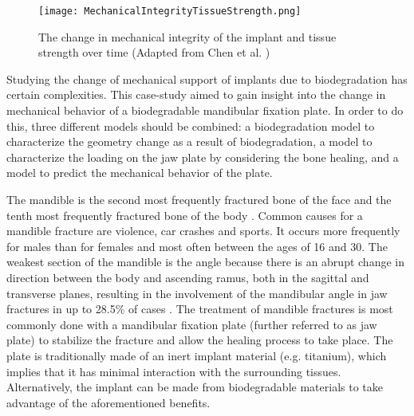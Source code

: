 \begin{figure}[ht]
    \centering
    \texttt{[image: MechanicalIntegrityTissueStrength.png]}
    \caption{The change in mechanical integrity of the implant and tissue strength over time (Adapted from Chen et al. \cite{KChen})}
    \label{fig:rateofdeg}
\end{figure}

Studying the change of mechanical support of implants due to biodegradation has certain complexities. This case-study aimed to gain insight into the change in mechanical behavior of a biodegradable mandibular fixation plate. In order to do this, three different models should be combined: a biodegradation model to characterize the geometry change as a result of biodegradation, a model to characterize the loading on the jaw plate by considering the bone healing, and a model to predict the mechanical behavior of the plate.

The mandible is the second most frequently fractured bone of the face and the tenth most frequently fractured bone of the body \cite{Bhavik}. Common causes for a mandible fracture are violence, car crashes and sports. It occurs more frequently for males than for females and most often between the ages of 16 and 30. The weakest section of the mandible is the angle because there is an abrupt change in direction between the body and ascending ramus, both in the sagittal and transverse planes, resulting in the involvement of the mandibular angle in jaw fractures in up to 28.5\% of cases \cite{Levy}. The treatment of mandible fractures is most commonly done with a mandibular fixation plate (further referred to as jaw plate) to stabilize the fracture and allow the healing process to take place. The plate is traditionally made of an inert implant material (e.g. titanium), which implies that it has minimal interaction with the surrounding tissues. Alternatively, the implant can be made from biodegradable materials to take advantage of the aforementioned benefits.


